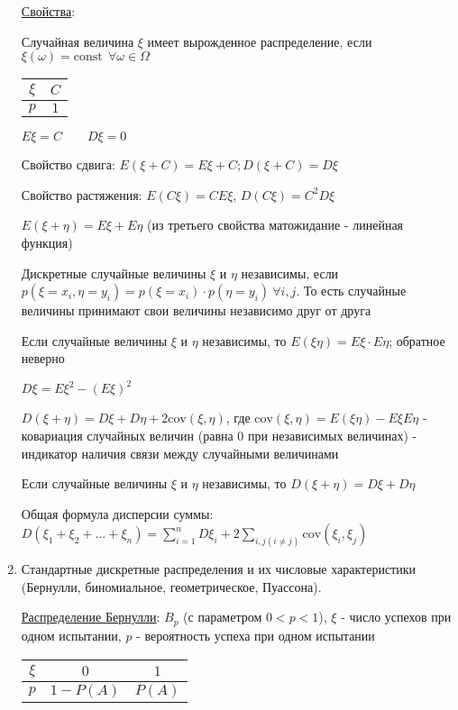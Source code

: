 \documentclass[12pt]{article}
\begin{document}
\begin{enumerate}
    \hyperlink{expectedvalueandvarianceproperties}{Свойства}: 

     Случайная величина $\xi$ имеет вырожденное распределение, если $\xi(\omega) = \mathrm{const} \ \ \forall \omega \in \Omega$

    \begin{tabular}{c|c}
        $\xi$ & $C$ \\
        \hline
        $p$   & $1$
    \end{tabular}

    $E\xi = C \qquad D\xi = 0$

     Свойство сдвига: $E(\xi + C) = E\xi + C; D (\xi + C) = D\xi$

     Свойство растяжения: $E(C\xi) = CE\xi$, $D(C\xi) = C^2 D\xi$

     $E(\xi + \eta) = E\xi + E\eta$ (из третьего свойства матожидание - линейная функция)

    \Def Дискретные случайные величины $\xi$ и $\eta$ независимы, если $p(\xi = x_i, \eta = y_i) = p(\xi = x_i) \cdot p(\eta = y_i) \ \forall i, j$.
    То есть случайные величины принимают свои величины независимо друг от друга

     Если случайные величины $\xi$ и $\eta$ независимы, то $E(\xi \eta) = E\xi \cdot E\eta$; обратное неверно

     $D\xi = E\xi^2 - (E\xi)^2$

    \Def $D(\xi + \eta) = D\xi + D\eta + 2\mathrm{cov} (\xi, \eta)$,
    где $\mathrm{cov}(\xi, \eta) = E(\xi\eta) - E\xi E\eta$ - ковариация случайных величин (равна 0 при независимых величинах) - индикатор наличия связи между случайными величинами

     Если случайные величины $\xi$ и $\eta$ независимы, то $D(\xi + \eta) = D\xi + D\eta$

     Общая формула дисперсии суммы: $D(\xi_1 + \xi_2 + \dots + \xi_n) = \sum_{i = 1}^n D \xi_i + 2\sum_{i, j (i \neq j)} \mathrm{cov} (\xi_i, \xi_j)$

    \item Стандартные дискретные распределения и их числовые характеристики (Бернулли, биномиальное, геометрическое, Пуассона).
    
    \hyperlink{bernoullidistribution}{Распределение Бернулли}: $B_p$ (с параметром $0 < p < 1$), $\xi$ - число успехов при одном испытании, $p$ - вероятность успеха при одном испытании

    \begin{tabular}{c|c|c}
        $\xi$ & $0$        & $1$    \\
        \hline
        $p$   & $1 - P(A)$ & $P(A)$
    \end{tabular}


\end{enumerate}
\end{document}
